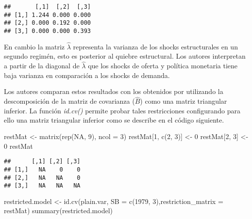 \documentclass[
]{book}
\newenvironment{Shaded}{\begin{snugshade}}{\end{snugshade}}
\newcommand{\AttributeTok}[1]{\textcolor[rgb]{0.77,0.63,0.00}{#1}}
\newcommand{\ConstantTok}[1]{\textcolor[rgb]{0.00,0.00,0.00}{#1}}
\newcommand{\DecValTok}[1]{\textcolor[rgb]{0.00,0.00,0.81}{#1}}
\newcommand{\FunctionTok}[1]{\textcolor[rgb]{0.00,0.00,0.00}{#1}}
\newcommand{\NormalTok}[1]{#1}
\newcommand{\OtherTok}[1]{\textcolor[rgb]{0.56,0.35,0.01}{#1}}
\begin{document}
\begin{verbatim}
##       [,1]  [,2]  [,3]
## [1,] 1.244 0.000 0.000
## [2,] 0.000 0.192 0.000
## [3,] 0.000 0.000 0.393
\end{verbatim}

En cambio la matriz \(\hat{\lambda}\) representa la varianza de los shocks estructurales en un segundo regimén, esto es posterior al quiebre estructural. Los autores interpretan a partir de la diagonal de \(\hat{\lambda}\) que los shocks de oferta y política monetaria tiene baja varianza en comparación a los shocks de demanda.

Los autores comparan estos resultados con los obtenidos por \citet{Sims80} utilizando la descomposición de la matriz de covarianza (\(\hat{B}\)) como una matriz triangular inferior. La función \emph{id.cv()} permite
probar tales restricciones configurando para ello una matriz triangular inferior como se describe en el código siguiente.

\begin{Shaded}
\begin{Highlighting}[]
\NormalTok{restMat }\OtherTok{\textless{}{-}} \FunctionTok{matrix}\NormalTok{(}\FunctionTok{rep}\NormalTok{(}\ConstantTok{NA}\NormalTok{, }\DecValTok{9}\NormalTok{), }\AttributeTok{ncol =} \DecValTok{3}\NormalTok{)}
\NormalTok{restMat[}\DecValTok{1}\NormalTok{, }\FunctionTok{c}\NormalTok{(}\DecValTok{2}\NormalTok{, }\DecValTok{3}\NormalTok{)] }\OtherTok{\textless{}{-}} \DecValTok{0}
\NormalTok{restMat[}\DecValTok{2}\NormalTok{, }\DecValTok{3}\NormalTok{] }\OtherTok{\textless{}{-}} \DecValTok{0}
\NormalTok{restMat}
\end{Highlighting}
\end{Shaded}

\begin{verbatim}
##      [,1] [,2] [,3]
## [1,]   NA    0    0
## [2,]   NA   NA    0
## [3,]   NA   NA   NA
\end{verbatim}

\begin{Shaded}
\begin{Highlighting}[]
\NormalTok{restricted.model }\OtherTok{\textless{}{-}} \FunctionTok{id.cv}\NormalTok{(plain.var, }\AttributeTok{SB =} \FunctionTok{c}\NormalTok{(}\DecValTok{1979}\NormalTok{, }\DecValTok{3}\NormalTok{),}\AttributeTok{restriction\_matrix =}\NormalTok{ restMat)}
\FunctionTok{summary}\NormalTok{(restricted.model)}
\end{Highlighting}
\end{Shaded}
\end{document}
